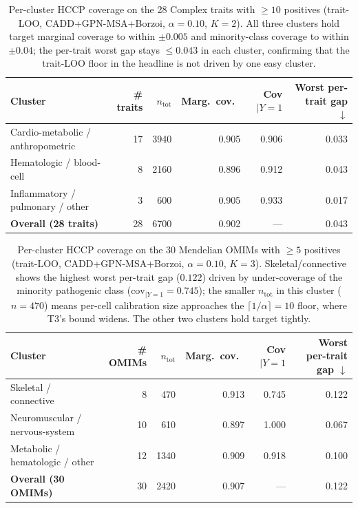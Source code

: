 \begin{table}[h]
\centering
\small
\caption{Per-cluster HCCP coverage on the 28 Complex traits with $\geq 10$ positives (trait-LOO, CADD+GPN-MSA+Borzoi, $\alpha = 0.10$, $K = 2$). All three clusters hold target marginal coverage to within $\pm 0.005$ and minority-class coverage to within $\pm 0.04$; the per-trait worst gap stays $\leq 0.043$ in each cluster, confirming that the trait-LOO floor in the headline is not driven by one easy cluster.}
\label{tab:trait_cluster}
\begin{tabular}{lrrrrr}
\toprule
Cluster & \# traits & $n_{\mathrm{tot}}$ & Marg.\ cov.\ & Cov$|Y{=}1$ & Worst per-trait gap $\downarrow$ \\
\midrule
Cardio-metabolic / anthropometric    & 17 & 3940 & 0.905 & 0.906 & 0.033 \\
Hematologic / blood-cell             & 8  & 2160 & 0.896 & 0.912 & 0.043 \\
Inflammatory / pulmonary / other     & 3  & 600  & 0.905 & 0.933 & 0.017 \\
\midrule
\textbf{Overall (28 traits)} & 28 & 6700 & 0.902 & --- & 0.043 \\
\bottomrule
\end{tabular}
\end{table}

\begin{table}[h]
\centering
\small
\caption{Per-cluster HCCP coverage on the 30 Mendelian OMIMs with $\geq 5$ positives (trait-LOO, CADD+GPN-MSA+Borzoi, $\alpha = 0.10$, $K = 3$). Skeletal/connective shows the highest worst per-trait gap ($0.122$) driven by under-coverage of the minority pathogenic class ($\mathrm{cov}_{|Y=1} = 0.745$); the smaller $n_{\mathrm{tot}}$ in this cluster ($n = 470$) means per-cell calibration size approaches the $\lceil 1/\alpha\rceil = 10$ floor, where T3's bound widens. The other two clusters hold target tightly.}
\label{tab:omim_cluster}
\begin{tabular}{lrrrrr}
\toprule
Cluster & \# OMIMs & $n_{\mathrm{tot}}$ & Marg.\ cov.\ & Cov$|Y{=}1$ & Worst per-trait gap $\downarrow$ \\
\midrule
Skeletal / connective           & 8  & 470  & 0.913 & 0.745 & 0.122 \\
Neuromuscular / nervous-system  & 10 & 610  & 0.897 & 1.000 & 0.067 \\
Metabolic / hematologic / other & 12 & 1340 & 0.909 & 0.918 & 0.100 \\
\midrule
\textbf{Overall (30 OMIMs)} & 30 & 2420 & 0.907 & --- & 0.122 \\
\bottomrule
\end{tabular}
\end{table}

